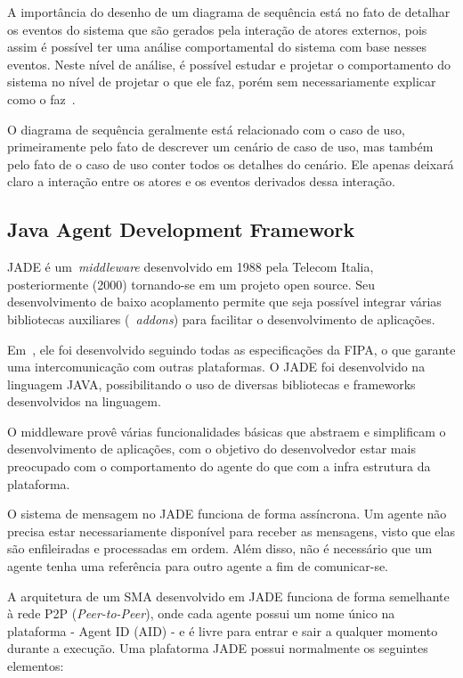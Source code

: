 A importância do desenho de um diagrama de sequência está no fato de detalhar os eventos do sistema que são gerados pela interação de atores externos, pois assim é possível ter uma análise comportamental do sistema com base nesses eventos. Neste nível de análise, é possível estudar e projetar o comportamento do sistema no nível de projetar o que ele faz, porém sem necessariamente explicar como o faz~\cite{larman08}.

O diagrama de sequência geralmente está relacionado com o caso de uso, primeiramente pelo fato de descrever um cenário de caso de uso, mas também pelo fato de o caso de uso conter todos os detalhes do cenário. Ele apenas deixará claro a interação entre os atores e os eventos derivados dessa interação.


\subsection{Java Agent Development Framework}

JADE é um~\emph{middleware} desenvolvido em 1988 pela Telecom Italia, posteriormente (2000) tornando-se em um projeto open source. Seu desenvolvimento de baixo acoplamento permite que seja possível integrar várias bibliotecas auxiliares (~\emph{addons}) para facilitar o desenvolvimento de aplicações.

Em~\cite{bellifemine07}, ele foi desenvolvido seguindo todas as especificações da FIPA, o que garante uma intercomunicação com outras plataformas. O JADE foi desenvolvido na linguagem JAVA, possibilitando o uso de diversas bibliotecas e frameworks desenvolvidos na linguagem.

O middleware provê várias funcionalidades básicas que abstraem e simplificam o desenvolvimento de aplicações, com o objetivo do desenvolvedor estar mais preocupado com o comportamento do agente do que com a infra estrutura da plataforma.

O sistema de mensagem no JADE funciona de forma assíncrona. Um agente não precisa estar necessariamente disponível para receber as mensagens, visto que elas são enfileiradas e processadas em ordem. Além disso, não é necessário que um agente tenha uma referência para outro agente a fim de comunicar-se.

A arquitetura de um SMA desenvolvido em JADE funciona de forma semelhante à rede P2P (\emph{Peer-to-Peer}), onde cada agente possui um nome único na plataforma - Agent ID (AID) - e é livre para entrar e sair a qualquer momento durante a execução. Uma plafatorma JADE possui normalmente os seguintes elementos:

